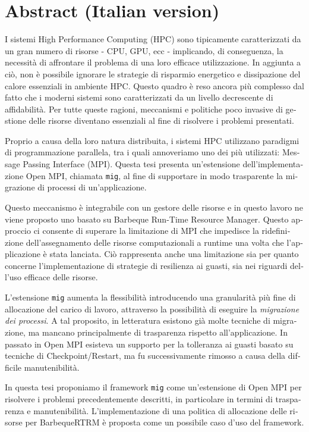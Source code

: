 \chapter*{Abstract (Italian version)}

\begin{otherlanguage}{italian}

\lettrine{I}{} sistemi High Performance Computing (HPC) sono tipicamente
caratterizzati da
un gran numero di risorse - CPU, GPU, ecc - implicando, di conseguenza, la necessità di
affrontare il problema di una loro efficace utilizzazione. In aggiunta a ciò, non
è possibile ignorare le strategie di risparmio energetico e dissipazione del calore essenziali in ambiente HPC.
Questo quadro è reso ancora più complesso dal fatto che i moderni
sistemi sono caratterizzati da un livello decrescente di affidabilità.
Per tutte queste ragioni, meccanismi e politiche poco invasive
di gestione delle risorse diventano essenziali al fine di risolvere i problemi presentati.

Proprio a causa della loro natura distribuita, i sistemi HPC utilizzano
paradigmi di programmazione
parallela, tra i quali annoveriamo uno dei più utilizzati: Message Passing
Interface (MPI). Questa tesi presenta un'estensione dell'implementazione
Open MPI, chiamata \texttt{mig}, al fine di supportare in modo trasparente
la migrazione di processi di un'applicazione.

Questo meccanismo è integrabile con un gestore delle risorse
e in questo lavoro ne viene proposto uno basato su Barbeque
Run-Time Resource Manager. Questo approccio ci consente di superare la
limitazione di MPI che impedisce la ridefinizione dell'assegnamento delle risorse computazionali a runtime una volta che l'applicazione è stata lanciata. Ciò
rappresenta anche una limitazione sia per quanto concerne l'implementazione di strategie di resilienza ai guasti, sia nei riguardi dell'uso efficace delle risorse. 

L'estensione \texttt{mig} aumenta la flessibilità introducendo una granularità
più fine di allocazione del carico di lavoro, attraverso la possibilità di
eseguire la \emph{migrazione dei processi}. A tal proposito, in letteratura esistono già molte tecniche di migrazione, ma mancano principalmente
di trasparenza
rispetto all'applicazione. In passato in Open MPI esisteva un supporto per la
tolleranza ai guasti basato su tecniche di Checkpoint/Restart, ma fu
successivamente rimosso a causa della difficile manutenibilità.

In questa tesi proponiamo il framework \texttt{mig} come un'estensione di
Open MPI per risolvere i problemi precedentemente descritti, in particolare
in termini di
trasparenza e manutenibilità. L'implementazione di una politica di allocazione
delle risorse per BarbequeRTRM è proposta come un possibile caso d'uso del framework.


\end{otherlanguage}

